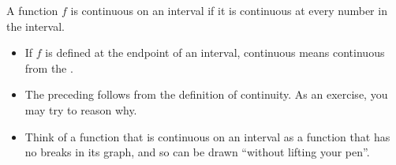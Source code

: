 \begin{frame}
\begin{definition}
A function $f$ is continuous on an interval if it is continuous at every number in the interval.

\end{definition}
\begin{itemize}

\item<2-> If $f$ is defined at the   endpoint of an interval, continuous means continuous from the  . 
\item<4->{\alert<4>{The preceding follows from the definition of continuity. As an exercise, you may try to reason why.}}
\item<5->{
Think of a function that is continuous on an interval as a function that has no breaks in its graph, and so can be drawn ``without lifting your pen''.
}
\end{itemize}


\end{frame}
